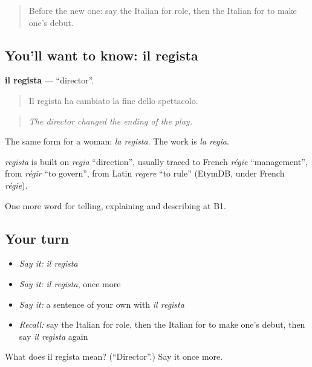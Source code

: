 \label{lesson:IT-C520-regista}



\begin{quote}
Before the new one: say the Italian for role, then the Italian for to make one's debut.
\end{quote}

\subsection*{You'll want to know: il regista}
\textbf{il regista} — \textquotedblleft{}director\textquotedblright{}.

\begin{quote}
Il regista ha cambiato la fine dello spettacolo.
\end{quote}

\begin{quote}
\emph{The director changed the ending of the play.}
\end{quote}

The same form for a woman: \emph{la regista}. The work is \emph{la regia}.

\begin{cousinweb}
\emph{regista} is built on \emph{regia} \textquotedblleft{}direction\textquotedblright{}, usually traced to French \emph{régie} \textquotedblleft{}management\textquotedblright{}, from \emph{régir} \textquotedblleft{}to govern\textquotedblright{}, from Latin \emph{regere} \textquotedblleft{}to rule\textquotedblright{} (EtymDB, under French \emph{régie}).
\end{cousinweb}

\begin{grammarlens}[title={What you've built}]
One more word for telling, explaining and describing at B1.
\end{grammarlens}

\subsection*{Your turn}
\begin{itemize}
\raggedright
  \item \emph{Say it:} \emph{il regista}
  \item \emph{Say it:} \emph{il regista}, once more
  \item \emph{Say it:} a sentence of your own with \emph{il regista}
  \item \emph{Recall:} say the Italian for role, then the Italian for to make one's debut, then say \emph{il regista} again
\end{itemize}

\begin{tcolorbox}[breakable,colback=teal!4,colframe=teal!35!black,title={Before you move on}]
What does il regista mean? (\textquotedblleft{}Director\textquotedblright{}.) Say it once more.
\end{tcolorbox}
